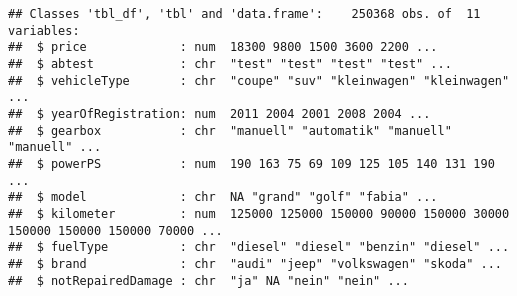 \documentclass[]{article}
\newenvironment{Shaded}{\begin{snugshade}}{\end{snugshade}}
\newcommand{\CommentTok}[1]{\textcolor[rgb]{0.56,0.35,0.01}{\textit{#1}}}
\newcommand{\DecValTok}[1]{\textcolor[rgb]{0.00,0.00,0.81}{#1}}
\newcommand{\KeywordTok}[1]{\textcolor[rgb]{0.13,0.29,0.53}{\textbf{#1}}}
\newcommand{\NormalTok}[1]{#1}
\newcommand{\OperatorTok}[1]{\textcolor[rgb]{0.81,0.36,0.00}{\textbf{#1}}}
\newcommand{\StringTok}[1]{\textcolor[rgb]{0.31,0.60,0.02}{#1}}
\begin{document}
\begin{Shaded}
\end{Shaded}

\begin{verbatim}
## Classes 'tbl_df', 'tbl' and 'data.frame':    250368 obs. of  11 variables:
##  $ price             : num  18300 9800 1500 3600 2200 ...
##  $ abtest            : chr  "test" "test" "test" "test" ...
##  $ vehicleType       : chr  "coupe" "suv" "kleinwagen" "kleinwagen" ...
##  $ yearOfRegistration: num  2011 2004 2001 2008 2004 ...
##  $ gearbox           : chr  "manuell" "automatik" "manuell" "manuell" ...
##  $ powerPS           : num  190 163 75 69 109 125 105 140 131 190 ...
##  $ model             : chr  NA "grand" "golf" "fabia" ...
##  $ kilometer         : num  125000 125000 150000 90000 150000 30000 150000 150000 150000 70000 ...
##  $ fuelType          : chr  "diesel" "diesel" "benzin" "diesel" ...
##  $ brand             : chr  "audi" "jeep" "volkswagen" "skoda" ...
##  $ notRepairedDamage : chr  "ja" NA "nein" "nein" ...
\end{verbatim}
\end{document}
